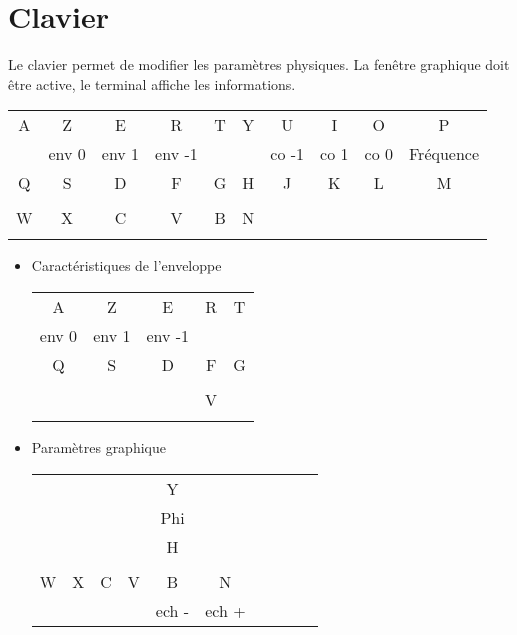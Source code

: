 \section{Clavier}
Le clavier permet de modifier les paramètres physiques. La fenêtre graphique doit être active, le terminal affiche les informations.
%
\footnotesize
\begin{center}
\begin{tabular}{cccccccccc}
\sf A &\sf Z &\sf E &\sf R &\sf T &\sf Y &\sf U &\sf I &\sf O &\sf P \\
 & env 0 & env 1 & env -1 &  &  & co -1 & co 1 & co 0 & Fréquence \\
\sf Q &\sf S &\sf D &\sf F &\sf G &\sf H &\sf J &\sf K &\sf L &\sf M \\
 &  &  &  &  &  &  &  &  &  \\
\sf W &\sf X &\sf C &\sf V &\sf B &\sf N &  &  &  & \\
 &  &  &  &  &  &  &  &  & \\
\end{tabular}
\end{center}
\vspace{.3cm}
%
\normalsize
\begin{itemize}[leftmargin=2cm, label=, itemsep=0pt]%
\item Caractéristiques de l'enveloppe

\begin{tabular}{ccccc}
\sf A &\sf Z &\sf E &\sf R &\sf T  \\
env 0 & env 1 & env -1 &  &   \\
\sf Q &\sf S &\sf D &\sf F &\sf G  \\
 &  &  &  &   \\
 & & & \sf V   & \\
 & & &  &  \\
\end{tabular}
%
\end{itemize}
\begin{itemize}[leftmargin=2cm, label=, itemsep=0pt]%
\item Paramètres graphique

\hspace{3cm}
\begin{tabular}{cccccccccc}
 & & & &\sf Y \\
 & & & & Phi \\
 & & & &\sf H \\
 & & & &   & & &  & \\
\sf W &\sf X &\sf C &\sf V &\sf B &\sf N  \\
 &  &  &  & ech - & ech + \\
\end{tabular}
%
\end{itemize}
